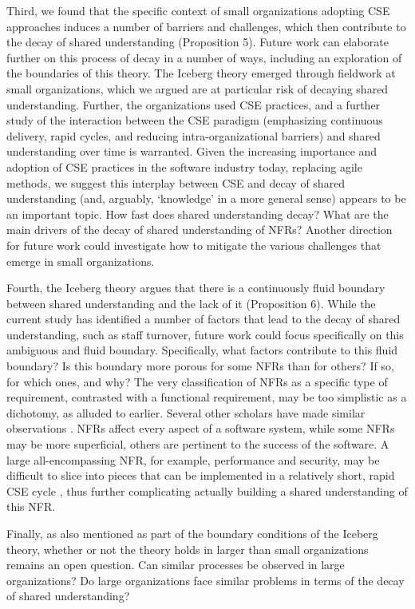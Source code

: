 \documentclass[smallextended]{svjour3}        %
\begin{document}
Third, we found that the specific context of small organizations adopting CSE approaches induces a number of barriers and challenges, which then contribute to the decay of shared understanding (Proposition 5). Future work can elaborate further on this process of decay in a number of ways, including an exploration of the boundaries of this theory. The Iceberg theory emerged through fieldwork at small organizations, which we argued are at particular risk of decaying shared understanding. Further, the organizations used CSE practices, and a further study of the interaction between the CSE paradigm (emphasizing continuous delivery, rapid cycles, and reducing intra-organizational barriers) and shared understanding over time is warranted. Given the increasing importance and adoption of CSE practices in the software industry today, replacing agile methods, we suggest this interplay between CSE and 
decay of shared understanding (and, arguably, `knowledge' in a more general sense) appears to be an important topic.
How fast does shared understanding decay? What are the main drivers of the decay of shared understanding of NFRs?
Another direction for future work could investigate how to mitigate the various challenges that emerge in small organizations. 


Fourth, the Iceberg theory argues that there is a continuously fluid boundary between shared understanding and the lack of it (Proposition 6). While the current study has identified a number of factors that lead to the decay of shared understanding, such as staff turnover, future work could focus specifically on this ambiguous and fluid boundary. Specifically, what factors contribute to this fluid boundary? Is this boundary more porous for some NFRs than for others? If so, for which ones, and why? The very classification of NFRs as a specific type of requirement, contrasted with a functional requirement, may be too simplistic as a dichotomy, as alluded to earlier. Several other scholars have made similar observations \citep{glinz_non-functional_2007,eckhardt2016non}.  
NFRs affect every aspect of a software system, while some NFRs may be more superficial, others are pertinent to the success of the software.
A large all-encompassing NFR, for example, performance and security, may be difficult to slice into pieces that can be implemented in a relatively short, rapid CSE cycle \citep{bellomo_evolutionary_2014}, thus further complicating actually building a shared understanding of this NFR.



Finally, as also mentioned as part of the boundary conditions of the Iceberg theory, whether or not the theory holds in larger than small organizations remains an open question. Can similar processes be observed in large organizations? Do large organizations face similar problems in terms of the decay of shared understanding?
\end{document}
